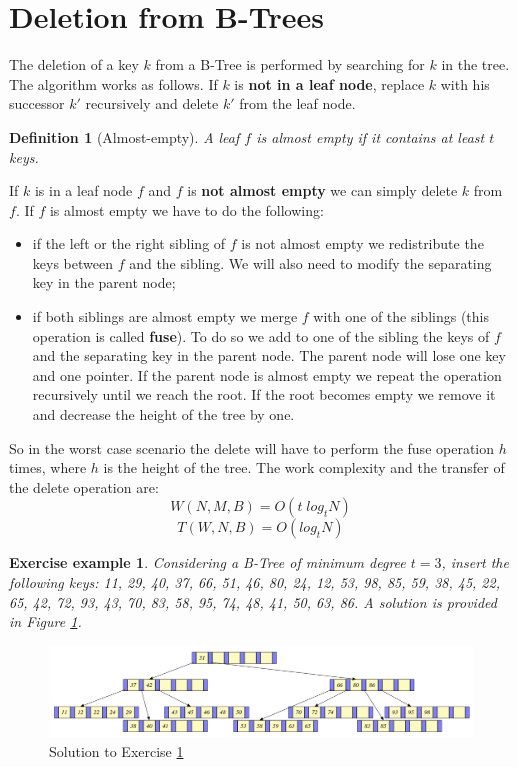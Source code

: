 \documentclass{report}
\newtheorem{defin}{Definition}[chapter]
\newtheorem{es}{Exercise example}[chapter]
\begin{document}
\section{Deletion from B-Trees}
The deletion of a key \(k\) from a B-Tree is performed by searching for \(k\) in the tree. The algorithm works as follows. If \(k\) is \textbf{not in a leaf node}, replace \(k\) with his successor \(k'\) recursively and delete \(k'\) from the leaf node.
\begin{defin}[Almost-empty]
    A leaf \(f\) is almost empty if it contains at least \(t\) keys.
\end{defin}
\noindent
If \(k\) is in a leaf node \(f\) and \(f\) is \textbf{not almost empty} we can simply delete \(k\) from \(f\). If \(f\) is almost empty we have to do the following:
\begin{itemize}
    \item if the left or the right sibling of \(f\) is not almost empty we redistribute the keys between \(f\) and the sibling. We will also need to modify the separating key in the parent node;
    \item if both siblings are almost empty we merge \(f\) with one of the siblings (this operation is called \textbf{fuse}). To do so we add to one of the sibling the keys of \(f\) and the separating key in the parent node. The parent node will lose one key and one pointer. If the parent node is almost empty we repeat the operation recursively until we reach the root. If the root becomes empty we remove it and decrease the height of the tree by one.
\end{itemize}
\noindent So in the worst case scenario the delete will have to perform the fuse operation \(h\) times, where \(h\) is the height of the tree. The work complexity and the transfer of the delete operation are:
\begin{equation}
    W(N,M,B) = O(t \; log_t N)
\end{equation}
\begin{equation}
    T(W,N,B) = O(log_t N)
\end{equation}
\begin{es}\label{ess}
    Considering a B-Tree of minimum degree \(t=3\), insert the following keys: 11, 29, 40, 37, 66, 51, 46, 80, 24, 12, 53, 98, 85, 59, 38, 45, 22, 65, 42, 72, 93, 43, 70, 83, 58, 95, 74, 48, 41, 50, 63, 86. A solution is provided in Figure \ref{fig:b_tree_insert}.
\end{es}
\begin{figure}
    \centering
    \includegraphics[width=1\textwidth]{img/sol.PNG}
    \caption{Solution to Exercise \ref{ess}}
    \label{fig:b_tree_insert}
\end{figure}
\end{document}
